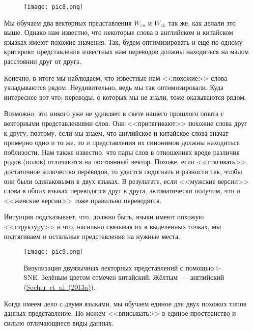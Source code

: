 \documentclass[a4paper,12pt]{article}
\begin{document}
\begin{figure}[t]
\begin{center}
\texttt{[image: pic8.png]}
\end{center}
\end{figure}


Мы обучаем два векторных представления $W_{en}$ и $W_{zh}$ так же, как делали это выше. Однако нам известно, что некоторые слова в английском и китайском язызках имеют похожие значения. Так, будем оптимизировать и ещё по одному критерию: представления известных нам переводов должны находиться на малом расстоянии друг от друга.

Конечно, в итоге мы наблюдаем, что известные нам <<похожие>> слова укладываются рядом. Неудивительно, ведь мы так оптимизировали. Куда интереснее вот что: переводы, о которых мы не знали, тоже оказываются рядом.

Возможно, это никого уже не удивляет в свете нашего прошлого опыта с векторными представлениями слов. Они <<притягивают>> похожие слова друг к другу, поэтому, если мы знаем, что английское и китайское слова значат примерно одно и то же, то и представления их синонимов должны находиться поблизости. Нам также известно, что пары слов в отношениях вроде различия родов (полов) отличаются на постоянный вектор.  Похоже, если <<стягивать>> достаточное количество переводов, то удастся подогнать и разности так, чтобы они были одинаковыми в двух языках. В результате, если <<мужские версии>> слова в обоих языках переводятся друг в друга, автоматически получим, что и <<женские версии>> тоже правильно переводятся.

Интуиция подсказывает, что, должно быть, языки имеют похожую <<структуру>> и что, насильно связывая их в выделенных точках, мы подтягиваем и остальные представления на нужные места.

\begin{figure}[t]
\begin{center}
\texttt{[image: pic9.png]}
\caption{Визулизация двуязычных векторных представлений с помощью t-SNE. Зелёным цветом отмечен китайский, Жёлтым~--- английский (\href{http://ai.stanford.edu/~wzou/emnlp2013_ZouSocherCerManning.pdf}{Socher~et~al. (2013a)}).}
\end{center}
\end{figure}

Когда имеем дело с двумя языками, мы обучаем единое для двух похожих типов данных представление. Но можем <<вписывать>> в единое пространство и сильно отличающиеся виды данных.
\end{document}
